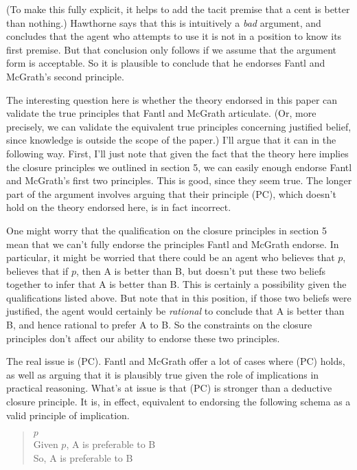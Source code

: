 \noindent (To make this fully explicit, it helps to add the tacit premise that a cent is better than nothing.) Hawthorne says that this is intuitively a \textit{bad} argument, and concludes that the agent who attempts to use it is not in a position to know its first premise. But that conclusion only follows if we assume that the argument form is acceptable. So it is plausible to conclude that he endorses Fantl and McGrath's second principle.

The interesting question here is whether the theory endorsed in this paper can validate the true principles that Fantl and McGrath articulate. (Or, more precisely, we can validate the equivalent true principles concerning justified belief, since knowledge is outside the scope of the paper.) I'll argue that it can in the following way. First, I'll just note that given the fact that the theory here implies the closure principles we outlined in section 5, we can easily enough endorse Fantl and McGrath's first two principles. This is good, since they seem true. The longer part of the argument involves arguing that their principle (PC), which doesn't hold on the theory endorsed here, is in fact incorrect.

One might worry that the qualification on the closure principles in section 5 mean that we can't fully endorse the principles Fantl and McGrath endorse. In particular, it might be worried that there could be an agent who believes that \(p\), believes that if \(p\), then A is better than B, but doesn't put these two beliefs together to infer that A is better than B. This is certainly a possibility given the qualifications listed above. But note that in this position, if those two beliefs were justified, the agent would certainly be \textit{rational} to conclude that A is better than B, and hence rational to prefer A to B.  So the constraints on the closure principles don't affect our ability to endorse these two principles.

The real issue is (PC). Fantl and McGrath offer a lot of cases where (PC) holds, as well as arguing that it is plausibly true given the role of implications in practical reasoning. What's at issue is that (PC) is stronger than a deductive closure principle. It is, in effect, equivalent to endorsing the following schema as a valid principle of implication.

\begin{quote}
\(p\) \\
\noindent Given \(p\), A is preferable to B \\
\noindent So, A is preferable to B
\end{quote}

